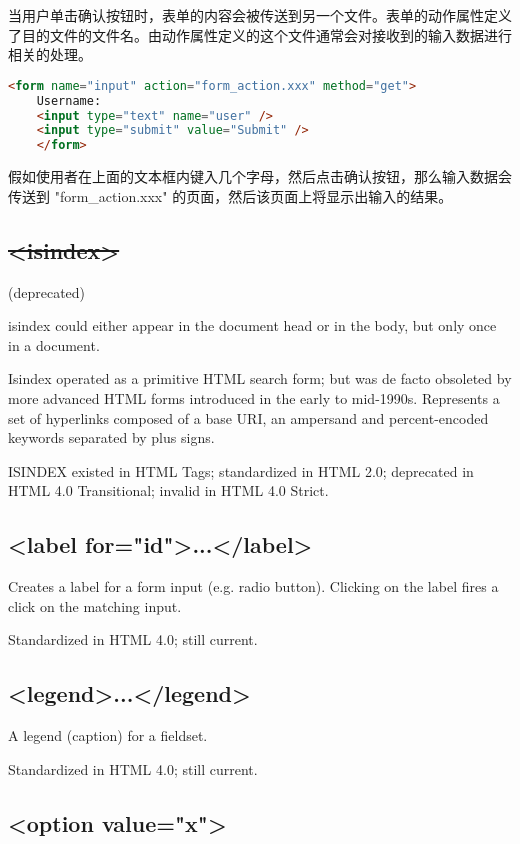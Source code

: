 当用户单击确认按钮时，表单的内容会被传送到另一个文件。表单的动作属性定义了目的文件的文件名。由动作属性定义的这个文件通常会对接收到的输入数据进行相关的处理。

\begin{lstlisting}[language=HTML]
	<form name="input" action="form_action.xxx" method="get">
	Username: 
	<input type="text" name="user" />
	<input type="submit" value="Submit" />
	</form>
\end{lstlisting}

假如使用者在上面的文本框内键入几个字母，然后点击确认按钮，那么输入数据会传送到 "form\_action.xxx" 的页面，然后该页面上将显示出输入的结果。



\subsection{\sout{<isindex>}}

(deprecated)

isindex could either appear in the document head or in the body, but only once in a document.

Isindex operated as a primitive HTML search form; but was de facto obsoleted by more advanced HTML forms introduced in the early to mid-1990s. Represents a set of hyperlinks composed of a base URI, an ampersand and percent-encoded keywords separated by plus signs.

ISINDEX existed in HTML Tags; standardized in HTML 2.0; deprecated in HTML 4.0 Transitional; invalid in HTML 4.0 Strict.



\subsection{<label for="id">...</label>}


Creates a label for a form input (e.g. radio button). Clicking on the label fires a click on the matching input.

Standardized in HTML 4.0; still current.


\subsection{<legend>...</legend>}

A legend (caption) for a fieldset.

Standardized in HTML 4.0; still current.

\subsection{<option value="x">}


